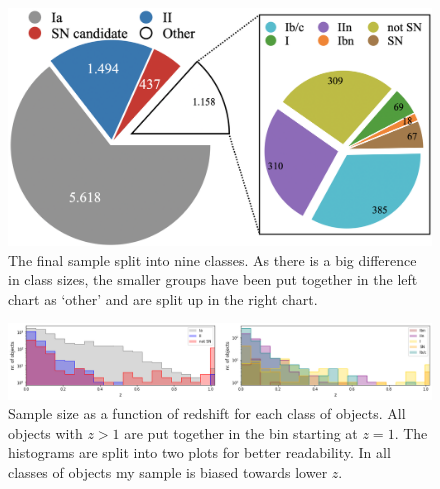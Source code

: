 \documentclass[a4paper,oneside,12pt, class=Latex/Classes/PhDthesisPSnPDF, crop=false]{standalone}
\begin{document}
\begin{figure}
    \centering
    \includegraphics[width=\textwidth]{../Images/chapter_4/sample_pie.png}
    \caption{The final sample split into nine classes. As there is a big difference in class sizes, the smaller groups have been put together in the left chart as `other' and are split up in the right chart.}
    \label{class_breakdown}
\end{figure}


\begin{figure}
    \centering
    \includegraphics[width=\textwidth]{../Images/chapter_4/sample_hists.png}
    \caption{Sample size as a function of redshift for each class of objects. All objects with $z>1$ are put together in the bin starting at $z=1$. The histograms are split into two plots for better readability. In all classes of objects my sample is biased towards lower $z$.}
    \label{class_hists}    
\end{figure}
\end{document}

